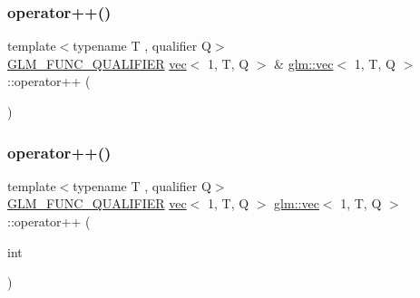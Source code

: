\mbox{\label{structglm_1_1vec_3_011_00_01_t_00_01_q_01_4_a987d92f70c9541002ae2b696f06947f0}} 
\subsubsection{\texorpdfstring{operator++()}{operator++()}\hspace{0.1cm}{\footnotesize\ttfamily [1/2]}}
{\footnotesize\ttfamily template$<$typename T , qualifier Q$>$ \\
\mbox{\hyperlink{setup_8hpp_a33fdea6f91c5f834105f7415e2a64407}{G\+L\+M\+\_\+\+F\+U\+N\+C\+\_\+\+Q\+U\+A\+L\+I\+F\+I\+ER}} \mbox{\hyperlink{structglm_1_1vec}{vec}}$<$ 1, T, Q $>$ \& \mbox{\hyperlink{structglm_1_1vec}{glm\+::vec}}$<$ 1, T, Q $>$\+::operator++ (\begin{DoxyParamCaption}{ }\end{DoxyParamCaption})}

\mbox{\label{structglm_1_1vec_3_011_00_01_t_00_01_q_01_4_aa829fdf00e136856718ce8c37b43d507}} 
\subsubsection{\texorpdfstring{operator++()}{operator++()}\hspace{0.1cm}{\footnotesize\ttfamily [2/2]}}
{\footnotesize\ttfamily template$<$typename T , qualifier Q$>$ \\
\mbox{\hyperlink{setup_8hpp_a33fdea6f91c5f834105f7415e2a64407}{G\+L\+M\+\_\+\+F\+U\+N\+C\+\_\+\+Q\+U\+A\+L\+I\+F\+I\+ER}} \mbox{\hyperlink{structglm_1_1vec}{vec}}$<$ 1, T, Q $>$ \mbox{\hyperlink{structglm_1_1vec}{glm\+::vec}}$<$ 1, T, Q $>$\+::operator++ (\begin{DoxyParamCaption}\item[{int}]{ }\end{DoxyParamCaption})}

\mbox{\label{structglm_1_1vec_3_011_00_01_t_00_01_q_01_4_aefbc9c1c018abcb5c7e6ebe8c1d1fc1f}} 

